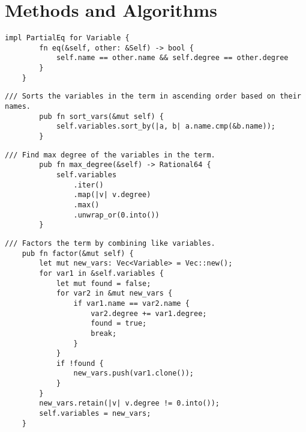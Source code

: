 \chapter{Methods and Algorithms}\label{chap:appendix-a}

\begin{lstlisting}[caption={The implementation of \texttt{PartialEq} for the \texttt{Variable} struct}, label={lst:variable-eq}]
    impl PartialEq for Variable {
        fn eq(&self, other: &Self) -> bool {
            self.name == other.name && self.degree == other.degree
        }
    }
\end{lstlisting}

\begin{minipage}{\linewidth}
    \begin{lstlisting}[caption={The implementation of the \texttt{sort\_vars()} method for the \texttt{Term} struct}, label={lst:term-sort-vars}]
        /// Sorts the variables in the term in ascending order based on their names.
        pub fn sort_vars(&mut self) {
            self.variables.sort_by(|a, b| a.name.cmp(&b.name));
        }
    \end{lstlisting}
\end{minipage}

\begin{minipage}{\linewidth}
    \begin{lstlisting}[caption={The implementation of the \texttt{max\_degree()} method for the \texttt{Term} struct}, label={lst:term-max-degree}]
        /// Find max degree of the variables in the term.
        pub fn max_degree(&self) -> Rational64 {
            self.variables
                .iter()
                .map(|v| v.degree)
                .max()
                .unwrap_or(0.into())
        }
    \end{lstlisting}
\end{minipage}

\begin{lstlisting}[caption={The implementation of the \texttt{factor()} method for the \texttt{Term} struct}, label={lst:term-factor}]
    /// Factors the term by combining like variables.
    pub fn factor(&mut self) {
        let mut new_vars: Vec<Variable> = Vec::new();
        for var1 in &self.variables {
            let mut found = false;
            for var2 in &mut new_vars {
                if var1.name == var2.name {
                    var2.degree += var1.degree;
                    found = true;
                    break;
                }
            }
            if !found {
                new_vars.push(var1.clone());
            }
        }
        new_vars.retain(|v| v.degree != 0.into());
        self.variables = new_vars;
    }
\end{lstlisting}

